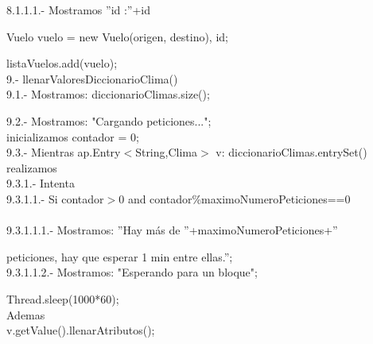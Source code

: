 \documentclass[30pt]{article}
\theoremstyle{definition}
\begin{document}
    \hspace{3cm} 8.1.1.1.- Mostramos ''id :''+id
    
    \hspace{2cm} Vuelo vuelo = new Vuelo(origen, destino), id;
    
    \hspace{2cm} listaVuelos.add(vuelo);\\
  
    \hspace{1cm} 9.- llenarValoresDiccionarioClima()\\

    \hspace{2cm} 9.1.- Mostramos: diccionarioClimas.size();

    \hspace{2cm} 9.2.- Mostramos: "Cargando peticiones...";\\

    \hspace{2cm} inicializamos contador = 0;\\

    \hspace{2cm} 9.3.- Mientras ap.Entry$<$String,Clima$>$ v:  diccionarioClimas.entrySet() realizamos\\

    \hspace{3cm}9.3.1.- Intenta\\

    \hspace{4cm}9.3.1.1.- Si contador$>$0 and contador\%maximoNumeroPeticiones==0 \\ \\

    \hspace{5cm}9.3.1.1.1.- Mostramos: ''Hay más de ''+maximoNumeroPeticiones+'' 
    
    \hspace{6.5cm} peticiones, hay que esperar 1 min entre ellas.'';\\
    
    \hspace{5cm}9.3.1.1.2.- Mostramos: "Esperando para un bloque";
    
    \hspace{6.5cm} Thread.sleep(1000*60);\\
    
    \hspace{3cm} Ademas\\
    
    \hspace{3cm} v.getValue().llenarAtributos();
    
\end{document}

